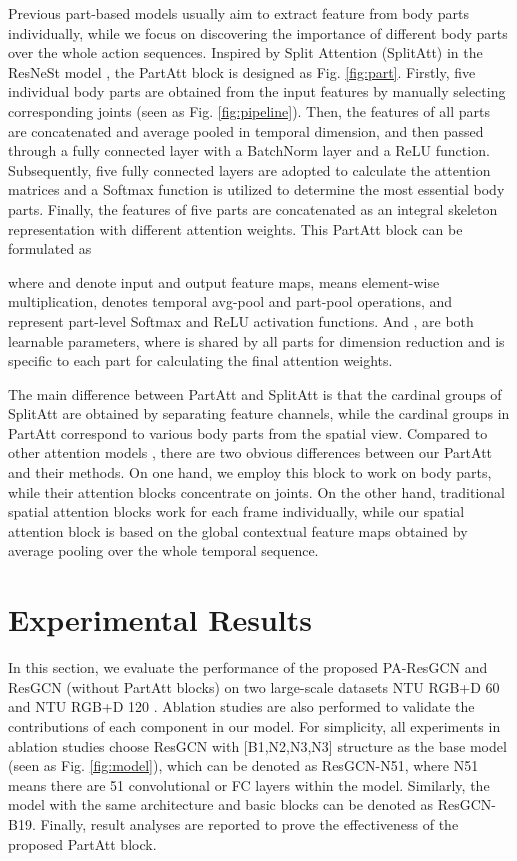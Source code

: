 \documentclass[sigconf]{acmart}
\begin{document}
Previous part-based models usually aim to extract feature from body parts individually, while we focus on discovering the importance of different body parts over the whole action sequences. Inspired by Split Attention (SplitAtt) in the ResNeSt model \cite{resnest2020zhang}, the PartAtt block is designed as Fig. \ref{fig:part}. Firstly, five individual body parts are obtained from the input features by manually selecting corresponding joints (seen as Fig. \ref{fig:pipeline}). Then, the features of all parts are concatenated and average pooled in temporal dimension, and then passed through a fully connected layer with a BatchNorm layer and a ReLU function. Subsequently, five fully connected layers are adopted to calculate the attention matrices and a Softmax function is utilized to determine the most essential body parts. Finally, the features of five parts are concatenated as an integral skeleton representation with different attention weights. This PartAtt block can be formulated as


where  and  denote input and output feature maps,  means element-wise multiplication,  denotes temporal avg-pool and part-pool operations,  and  represent part-level Softmax and ReLU activation functions. And ,  are both learnable parameters, where  is shared by all parts for dimension reduction and  is specific to each part for calculating the final attention weights.

The main difference between PartAtt and SplitAtt is that the cardinal groups of SplitAtt are obtained by separating feature channels, while the cardinal groups in PartAtt correspond to various body parts from the spatial view. Compared to other attention models \cite{song2017end, si2019attention}, there are two obvious differences between our PartAtt and their methods. On one hand, we employ this block to work on body parts, while their attention blocks concentrate on joints. On the other hand, traditional spatial attention blocks work for each frame individually, while our spatial attention block is based on the global contextual feature maps obtained by average pooling over the whole temporal sequence.

\section{Experimental Results}
\label{sec:experiments}

In this section, we evaluate the performance of the proposed PA-ResGCN and ResGCN (without PartAtt blocks) on two large-scale datasets NTU RGB+D 60 \cite{shahroudy2016ntu} and NTU RGB+D 120 \cite{liu2019ntu}. Ablation studies are also performed to validate the contributions of each component in our model. For simplicity, all experiments in ablation studies choose ResGCN with [B1,N2,N3,N3] structure as the base model (seen as Fig. \ref{fig:model}), which can be denoted as ResGCN-N51, where N51 means there are 51 convolutional or FC layers within the model. Similarly, the model with the same architecture and basic blocks can be denoted as ResGCN-B19. Finally, result analyses are reported to prove the effectiveness of the proposed PartAtt block.
\end{document}
